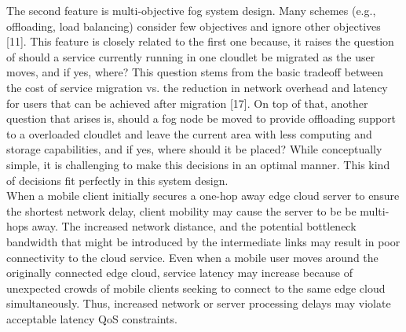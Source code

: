 \noindent\tab The second feature is multi-objective fog system design. Many schemes (e.g., offloading, load balancing) consider few objectives and ignore other objectives [11]. This feature is closely related to the first one because, it raises the question of should a service currently running in one cloudlet be migrated as the user moves, and if yes, where? This question stems from the basic tradeoff between the cost of service migration vs. the reduction in network overhead and latency for users that can be achieved after migration [17]. On top of that, another question that arises is, should a fog node be moved to provide offloading support to a overloaded cloudlet and leave the current area with less computing and storage capabilities, and if yes, where should it be placed? While conceptually simple, it is challenging to make this decisions in an optimal manner. This kind of decisions fit perfectly in this system design.\\[20pt]





When a mobile client initially
secures a one-hop away edge cloud server to ensure the shortest
network delay, client mobility may cause the server to be
be multi-hops away. The increased network distance, and the
potential bottleneck bandwidth that might be introduced by the
intermediate links may result in poor connectivity to the cloud
service. Even when a mobile user moves around the originally
connected edge cloud, service latency may increase because of
unexpected crowds of mobile clients seeking to connect to the
same edge cloud simultaneously. Thus, increased network or
server processing delays may violate acceptable latency QoS
constraints.

